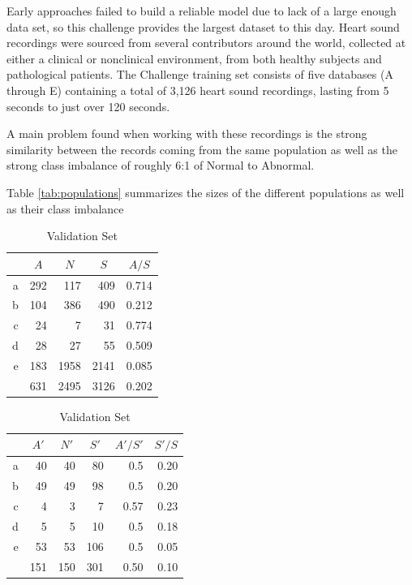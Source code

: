\documentclass{project-logbook}
\begin{document}
{Early approaches failed to build a reliable model due to lack of a large enough data set, so this challenge provides the largest dataset to this day. Heart sound recordings were sourced from several contributors around the world, collected at either a clinical or nonclinical environment, from both healthy subjects and pathological patients. The Challenge training set consists of five databases (A through E) containing a total of 3,126 heart sound recordings, lasting from 5 seconds to just over 120 seconds.

A main problem found when working with these recordings is the strong similarity between the records coming from the same population  as well as the strong class imbalance of roughly 6:1 of Normal to Abnormal.

Table \ref{tab:populations} summarizes the sizes of the different populations as well as their class imbalance


\begin{table}[ht]
    \centering
    \begin{subtable}{0.48\textwidth}
        \centering
        \begin{tabular}{*{5}{r}}
            {}  & \multicolumn{1}{c}{$A$} & \multicolumn{1}{c}{$N$} & \multicolumn{1}{c}{$S$} & \multicolumn{1}{c}{$A/S$} \\
            \midrule
            a & 292 & 117   & 409   & 0.714 \\
            b & 104 & 386   & 490   & 0.212 \\
            c & 24  & 7     & 31    & 0.774 \\
            d & 28  & 27    & 55    & 0.509 \\
            e & 183 & 1958  & 2141  & 0.085 \\
            \midrule
            & 631 & 2495 & 3126 & 0.202 \\
        \end{tabular}
        \caption{Training Set}
    \end{subtable}
    \begin{subtable}{0.48\textwidth}
        \centering
        \begin{tabular}{*{6}{r}}
            {}  & \multicolumn{1}{c}{$A'$} & \multicolumn{1}{c}{$N'$} & \multicolumn{1}{c}{$S'$} & \multicolumn{1}{c}{$A'/S'$} & $S'/S$ \\
            \midrule
            a & 40  & 40    & 80    & 0.5   & 0.20 \\
            b & 49  & 49    & 98    & 0.5   & 0.20 \\
            c & 4   & 3     & 7     & 0.57  & 0.23 \\
            d & 5   & 5     & 10    & 0.5   & 0.18 \\
            e & 53  & 53    & 106   & 0.5   & 0.05 \\
            \midrule
            & 151 & 150 & 301 & 0.50 & 0.10 \\
        \end{tabular}
        \caption{Validation Set}
    \end{subtable}
    

\end{table}}
\end{document}
